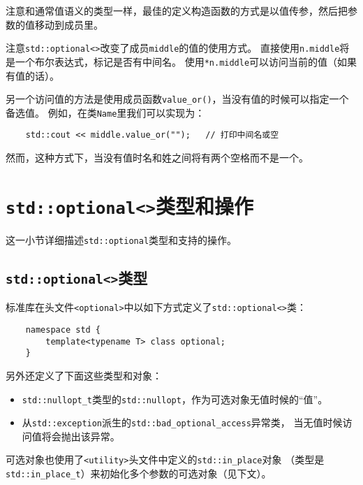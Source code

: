 注意和通常值语义的类型一样，最佳的定义构造函数的方式是以值传参，然后把参数的值移动到成员里。

注意\texttt{std::optional<>}改变了成员\texttt{middle}的值的使用方式。
直接使用\texttt{n.middle}将是一个布尔表达式，标记是否有中间名。
使用\texttt{*n.middle}可以访问当前的值（如果有值的话）。

另一个访问值的方法是使用成员函数\texttt{value\_or()}，当没有值的时候可以指定一个备选值。
例如，在类\texttt{Name}里我们可以实现为：
\begin{lstlisting}
    std::cout << middle.value_or("");   // 打印中间名或空
\end{lstlisting}
然而，这种方式下，当没有值时名和姓之间将有两个空格而不是一个。


\section{\texttt{std::optional<>}类型和操作}
这一小节详细描述\texttt{std::optional}类型和支持的操作。

\subsection{\texttt{std::optional<>}类型}
标准库在头文件\texttt{<optional>}中以如下方式定义了\texttt{std::optional<>}类：
\begin{lstlisting}
    namespace std {
        template<typename T> class optional;
    }
\end{lstlisting}
另外还定义了下面这些类型和对象：\label{nullopt}
\begin{itemize}
    \item \texttt{std::nullopt\_t}类型的\texttt{std::nullopt}，作为可选对象无值时候的“值”。
    \item 从\texttt{std::exception}派生的\texttt{std::bad\_optional\_access}异常类，
    当无值时候访问值将会抛出该异常。
\end{itemize}
可选对象也使用了\texttt{<utility>}头文件中定义的\texttt{std::in\_place}对象
（类型是\texttt{std::in\_place\_t}）来初始化多个参数的可选对象（见下文）。


